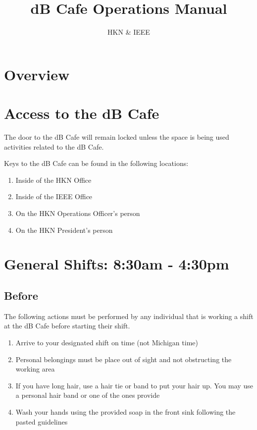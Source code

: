 \documentclass[12pt,onecolumn,letterpaper]{article}
\title{dB Cafe Operations Manual}
\author{HKN \& IEEE}
\date{ }
\begin{document}
\maketitle
\tableofcontents
\newpage

\section{Overview}

\section{Access to the dB Cafe}
The door to the dB Cafe will remain locked unless the space is being used activities related to the dB Cafe.

Keys to the dB Cafe can be found in the following locations:
\begin{enumerate}
\item Inside of the HKN Office
\item Inside of the IEEE Office
\item On the HKN Operations Officer's person
\item On the HKN President's person
\end{enumerate}

\section{General Shifts: 8:30am - 4:30pm}
\subsection{Before}
The following actions must be performed by any individual that is working a shift at the dB Cafe before starting their shift.
\begin{enumerate}
\item Arrive to your designated shift on time (not Michigan time)
\item Personal belongings must be place out of sight and not obstructing the working area
\item If you have long hair, use a hair tie or band to put your hair up. You may use a personal hair band or one of the ones provide
\item Wash your hands using the provided soap in the front sink following the pasted guidelines
\end{enumerate}
\end{document}

